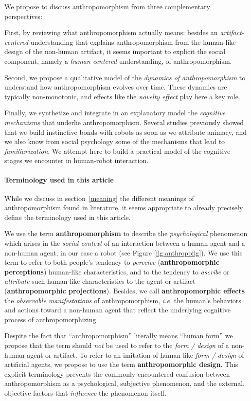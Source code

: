 \documentclass{frontiersSCNS} %
\newcommand{\ie}{\textit{i.e.}\xspace}
\begin{document}
We propose to discuss anthropomorphism from three complementary perspectives: 

First, by reviewing what anthropomorphism actually means: besides an
\emph{artifact-centered} understanding that explains anthropomorphism from the
human-like design of the non-human artifact, it seems important to explicit the
social component, namely a \emph{human-centered} understanding, of
anthropomorphism.

Second, we propose a qualitative model of the \textit{dynamics of
anthropomorphism} to understand how anthropomorphism evolves over time. These
dynamics are typically non-monotonic, and effects like the \emph{novelty effect} play here
a key role.

Finally, we synthetize and integrate in an explanatory model the \emph{cognitive
mechanisms} that underlie anthropomorphism. Several studies previously showed
that we build instinctive bonds with robots as soon as we attribute animacy, and
we also know from social psychology some of the mechanisms that lead to
\emph{familiarization}. We attempt here to build a practical model of the
cognitive stages we encounter in human-robot interaction.


\paragraph{Terminology used in this article\\}

While we discuss in section~\ref{meaning} the different meanings of
anthropomorphism found in literature, it seems appropriate to already precisely
define the terminology used in this article.

We use the term \textbf{anthropomorphism} to describe the \emph{psychological}
phenomenon which arises in the \emph{social context} of an interaction between a
human agent and a non-human agent, in our case a robot (see Figure
\ref{fig:anthropofig}). We use this term to refer to both people's tendency to
\textit{perceive} (\textbf{anthropomorphic perceptions}) human-like
characteristics, and to the tendency to \textit{ascribe} or \textit{attribute}
such human-like characteristics to the agent or artifact
(\textbf{anthropomorphic projections}). Besides, we call {\bf anthropomorphic
effects} the \emph{observable manifestations} of anthropomorphism, \ie the
human's behaviors and actions toward a non-human agent that reflect the
underlying cognitive process of anthropomorphizing.

Despite the fact that ``anthropomorphism'' literally means ``human
form'' we propose that the term should \textit{not} be used to refer to the
\textit{form / design} of a non-human agent or artifact. To refer to an
imitation of human-like \textit{form / design} of artificial agents, we propose
to use the term \textbf{anthropomorphic design}. This explicit terminology
prevents the commonly encountered confusion between anthropomorphism as a
psychological, subjective phenomenon, and the external, objective factors that
\emph{influence} the phenomenon itself.
\end{document}
